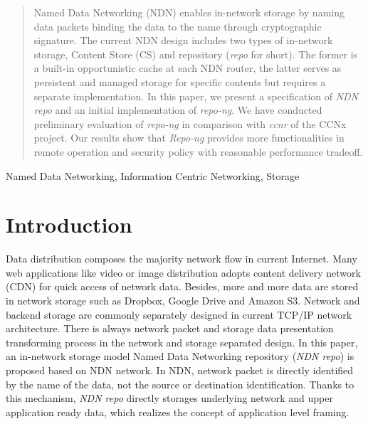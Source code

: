\documentclass[conference]{IEEEtran}
\begin{document}
\begin{abstract}
Named Data Networking (NDN) enables in-network storage by naming data packets binding the data to the name through cryptographic signature.  The current NDN design includes two types of in-network storage, Content Store (CS) and repository (\emph{repo} for short).  The former is a built-in opportunistic cache at each NDN router, the latter serves as persistent and managed storage for specific contents but requires a separate implementation. In this paper, we present a specification of \emph{NDN repo} and an initial implementation of \emph{repo-ng}.  We have conducted preliminary evaluation of \emph{repo-ng} in comparison with \emph{ccnr} of the CCNx project.  Our results show that \emph{Repo-ng} provides more functionalities in remote operation and security policy with reasonable performance tradeoff.

\end{abstract}


\begin{keywords}
Named Data Networking, Information Centric Networking, Storage
\end{keywords}


%
\IEEEpeerreviewmaketitle

\section{Introduction}

Data distribution composes the majority network flow in current Internet. Many web applications like video or image distribution adopts content delivery network (CDN) for quick access of network data. Besides, more and more data are stored in network storage such as Dropbox, Google Drive and Amazon S3. Network and backend storage are commonly separately designed in current TCP/IP network architecture. There is always network packet and storage data presentation transforming process in the network and storage separated design. In this paper, an in-network storage model Named Data Networking repository (\emph{NDN repo}) is proposed based on NDN network. In NDN, network packet is directly identified by the name of the data, not the source or destination identification. Thanks to this mechanism, \emph{NDN repo} directly storages underlying network and upper application ready data, which realizes the concept of application level framing. \cite{clark1990architectural}
\end{document}
